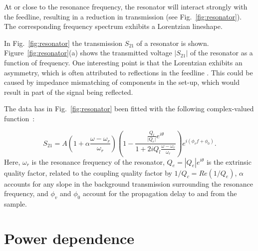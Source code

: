  At or close to the resonance frequency, the resonator will interact strongly with the feedline, resulting in a reduction in transmission (see Fig.~\ref{fig:resonator}). The corresponding frequency spectrum exhibits a Lorentzian lineshape.

  In Fig.~\ref{fig:resonator} the transmission $S_{21}$ of a resonator is shown. Figure~\ref{fig:resonator}(a) shows the transmitted voltage $|S_{21}|$ of the resonator as a function of frequency. One interesting point is that the Lorentzian exhibits an asymmetry, which is often attributed to reflections in the feedline \cite[p192]{Geerlings}. This could be caused by impedance mismatching of components in the set-up, which would result in part of the signal being reflected.

  The data has in Fig.~\ref{fig:resonator} been fitted with the following complex-valued function~\cite{bruno2015reducing}:

  \begin{equation}
    S_{21} =A \left( 1 + \alpha \frac{\omega-\omega_r}{\omega_r} \right)
    \left(1-\frac{\frac{Q_l}{\lvert Q_e \rvert}e^{i\theta}}{1+2iQ_l\frac{\omega-\omega_r}{\omega_r}}\right)e^{i\left(\phi_v f+\phi_0\right)}.
    \label{eq:THEhanger}
  \end{equation}
  Here, $\omega_r$ is the resonance frequency of the resonator, $Q_e=\left|Q_e\right|e^{i\theta}$ is the extrinsic quality factor, related to the coupling quality factor by $1/Q_c=Re\left(1/Q_e\right)$, $\alpha$ accounts for any slope in the background transmission surrounding the resonance frequency, and $\phi_v$ and $\phi_0$ account for the propagation delay to and from the sample.

\section{Power dependence}
\label{sec:resonator:results:power_dependence}

